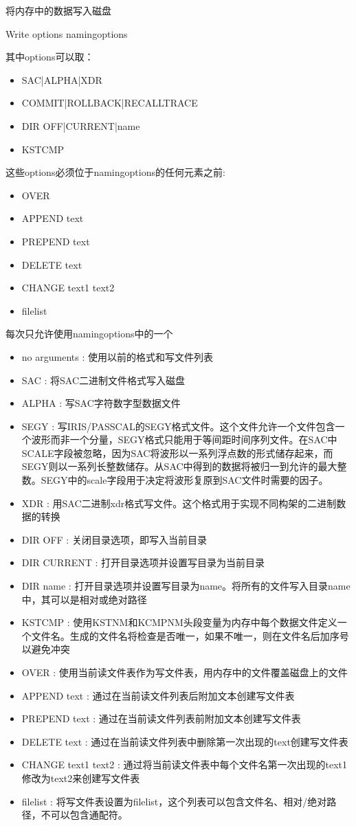 \label{cmd:write}

将内存中的数据写入磁盘

Write {options} {namingoptions}

其中options可以取：
\begin{itemize}
\item SAC|ALPHA|XDR
\item COMMIT|ROLLBACK|RECALLTRACE  
\item DIR OFF|CURRENT|name  
\item KSTCMP
\end{itemize}
这些options必须位于namingoptions的任何元素之前:
\begin{itemize}
\item OVER  
\item APPEND text  
\item PREPEND text  
\item DELETE text  
\item CHANGE text1 text2  
\item filelist  
\end{itemize}
每次只允许使用namingoptions中的一个

\begin{itemize}
\item no arguments : 使用以前的格式和写文件列表 
\item SAC : 将SAC二进制文件格式写入磁盘 
\item ALPHA : 写SAC字符数字型数据文件 
\item SEGY : 写IRIS/PASSCAL的SEGY格式文件。这个文件允许一个文件包含一个波形而非一个分量，SEGY格式只能用于等间距时间序列文件。在SAC中SCALE字段被忽略，因为SAC将波形以一系列浮点数的形式储存起来，而SEGY则以一系列长整数储存。从SAC中得到的数据将被归一到允许的最大整数。SEGY中的scale字段用于决定将波形复原到SAC文件时需要的因子。
\item XDR : 用SAC二进制xdr格式写文件。这个格式用于实现不同构架的二进制数据的转换 
\item DIR OFF : 关闭目录选项，即写入当前目录 
\item DIR CURRENT : 打开目录选项并设置写目录为当前目录 
\item DIR name : 打开目录选项并设置写目录为name。将所有的文件写入目录name中，其可以是相对或绝对路径 
\item KSTCMP : 使用KSTNM和KCMPNM头段变量为内存中每个数据文件定义一个文件名。生成的文件名将检查是否唯一，如果不唯一，则在文件名后加序号以避免冲突
\item OVER : 使用当前读文件表作为写文件表，用内存中的文件覆盖磁盘上的文件 
\item APPEND text : 通过在当前读文件列表后附加文本创建写文件表 
\item PREPEND text : 通过在当前读文件列表前附加文本创建写文件表 
\item DELETE text :  通过在当前读文件列表中删除第一次出现的text创建写文件表 
\item CHANGE text1 text2 : 通过将当前读文件表中每个文件名第一次出现的text1修改为text2来创建写文件表 
\item filelist : 将写文件表设置为filelist，这个列表可以包含文件名、相对/绝对路径，不可以包含通配符。 
\end{itemize}

